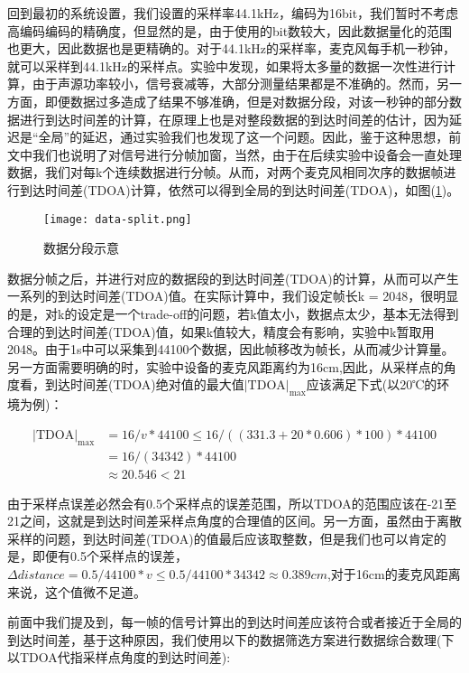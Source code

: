 \documentclass[winfonts,oneside]{njuthesis}
\begin{document}
		回到最初的系统设置，我们设置的采样率44.1kHz，编码为16bit，我们暂时不考虑高编码编码的精确度，但显然的是，由于使用的bit数较大，因此数据量化的范围也更大，因此数据也是更精确的。对于44.1kHz的采样率，麦克风每手机一秒钟，就可以采样到44.1kHz的采样点。实验中发现，如果将太多量的数据一次性进行计算，由于声源功率较小，信号衰减等，大部分测量结果都是不准确的。然而，另一方面，即便数据过多造成了结果不够准确，但是对数据分段，对该一秒钟的部分数据进行到达时间差的计算，在原理上也是对整段数据的到达时间差的估计，因为延迟是“全局”的延迟，通过实验我们也发现了这一个问题。因此，鉴于这种思想，前文中我们也说明了对信号进行分帧加窗，当然，由于在后续实验中设备会一直处理数据，我们对每k个连续数据进行分帧。从而，对两个麦克风相同次序的数据帧进行到达时间差(TDOA)计算，依然可以得到全局的到达时间差(TDOA)，如图(\ref{fig: data-split})。
		
		\begin{figure}[H]
			\centering
			\texttt{[image: data-split.png]} 
			\caption{{数据分段示意}}
			\label{fig: data-split}
		\end{figure}
		
		数据分帧之后，并进行对应的数据段的到达时间差(TDOA)的计算，从而可以产生一系列的到达时间差(TDOA)值。在实际计算中，我们设定帧长k = 2048，很明显的是，对k的设定是一个trade-off的问题，若k值太小，数据点太少，基本无法得到合理的到达时间差(TDOA)值，如果k值较大，精度会有影响，实验中k暂取用2048。由于1s中可以采集到44100个数据，因此帧移改为帧长，从而减少计算量。另一方面需要明确的时，实验中设备的麦克风距离约为16cm,因此，从采样点的角度看，到达时间差(TDOA)绝对值的最大值$|\text{TDOA}|_{\text{max}}$应该满足下式(以20℃的环境为例)：
		
		\begin{align}
			|\text{TDOA}|_{\text{max}} & = 16 / v * 44100 \leq 16 / ((331.3 + 20 * 0.606) * 100) * 44100  \\
									   & = 16 / (34342) * 44100\\
									   & \approx 20.546 < 21
		\end{align}
		
		由于采样点误差必然会有0.5个采样点的误差范围，所以TDOA的范围应该在-21至21之间，这就是到达时间差采样点角度的合理值的区间。另一方面，虽然由于离散采样的问题，到达时间差(TDOA)的值最后应该取整数，但是我们也可以肯定的是，即便有0.5个采样点的误差，$\Delta distance = 0.5 / 44100 * v \leq 0.5 / 44100 * 34342 \approx 0.389cm$,对于16cm的麦克风距离来说，这个值微不足道。
		
		前面中我们提及到，每一帧的信号计算出的到达时间差应该符合或者接近于全局的到达时间差，基于这种原因，我们使用以下的数据筛选方案进行数据综合数理(下以TDOA代指采样点角度的到达时间差):
		
\end{document}
